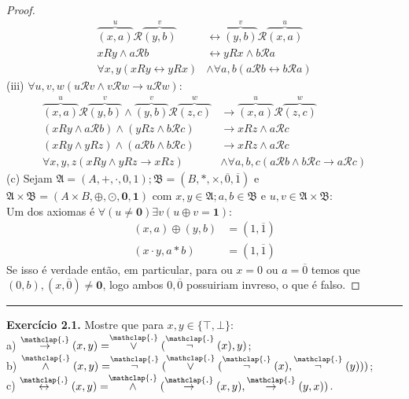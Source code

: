 \documentclass[11pt]{article}
\newcommand{\sse}{\leftrightarrow}
\newcommand{\mc}[1]{\mathcal{#1}}
\newcommand{\mf}[1]{\mathfrak{#1}}
\newcommand{\ol}[1]{\overline{#1}}
\newcommand\overtext[2]{\stackrel{\mathclap{\normalfont\mbox{#1}}}{#2}}
\begin{document}
\begin{proof}
    \begin{align*}
        \overbrace{(x,a)}^u\mathscr{R}\overbrace{(y,b)}^v & \sse \overbrace{(y,b)}^v\mathscr{R}\overbrace{(x,a)}^u\\
        xRy\wedge a\mc{R}b & \sse yRx\wedge b\mc{R}a\\
        \forall x,y(xRy\sse yRx) & \wedge \forall a,b(a\mc{R}b\sse b\mc{R}a)
    \end{align*}
    (iii) $\forall u,v,w(u\mathscr{R} v\wedge v\mathscr{R} w\to u\mathscr{R}w)$:
    \begin{align*}
        \overbrace{(x,a)}^u\mathscr{R}\overbrace{(y,b)}^v\wedge \overbrace{(y,b)}^v\mathscr{R}\overbrace{(z,c)}^w & \to \overbrace{(x,a)}^u\mathscr{R}\overbrace{(z,c)}^w\\
        (xRy\wedge a\mc{R}b)\wedge(yRz\wedge b\mc{R}c) & \to xRz\wedge a\mc{R}c\\
        (xRy\wedge yRz)\wedge(a\mc{R}b\wedge b\mc{R}c) & \to xRz\wedge a\mc{R}c\\
        \forall x,y,z(xRy\wedge yRz\to xRz) & \wedge\forall a,b,c(a\mc{R}b\wedge b\mc{R}c\to a\mc{R}c)
    \end{align*}
    (c) Sejam $\mf{A}=(A,+,\cdot,0,1);\mf{B}=(B,*,\times,\ol{0},\ol{1})$ e $\mf{A}\times\mf{B}=(A\times B,\oplus,\odot,\mathbf{0},\mathbf{1})$ com $x,y\in\mf{A};a,b\in\mf{B}$ e $u,v\in\mf{A}\times\mf{B}$:\\
    Um dos axiomas é $\forall(u\ne\mathbf{0})\exists v(u\oplus v=\mathbf{1})$:
    \begin{align*}
        (x,a)\oplus(y,b) & =(1,\ol{1})\\
        (x\cdot y,a*b) & = (1,\ol{1})
    \end{align*}
    Se isso é verdade então, em particular, para ou $x=0$ ou $a=\ol{0}$ temos que $(0,b),(x,\ol{0})\ne\mathbf{0}$, logo ambos $0,\ol{0}$ possuiriam invreso, o que é falso.
\end{proof}

\hrule

\begin{shaded}
\textbf{Exercício 2.1.} Mostre que para $x,y\in\{\top,\bot\}$:\\
a) $\overtext{.}{\to}(x,y)=\overtext{.}{\vee}(\overtext{.}{\neg}(x),y)$;\\
b) $\overtext{.}{\wedge}(x,y)=\overtext{.}{\neg}(\overtext{.}{\vee}(\overtext{.}{\neg}(x),\overtext{.}{\neg}(y)))$;\\
c) $\overtext{.}{\leftrightarrow}(x,y)=\overtext{.}{\wedge}(\overtext{.}{\to}(x,y),\overtext{.}{\to}(y,x))$.
\end{shaded}
\end{document}
